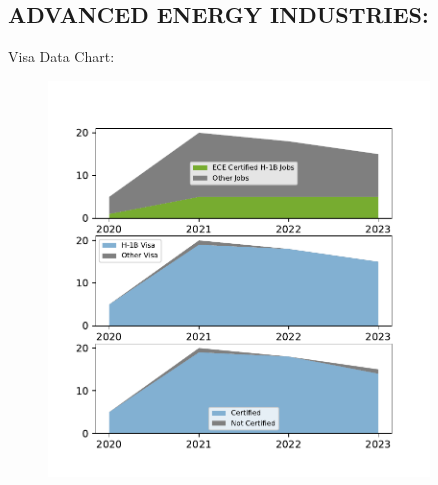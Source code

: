 \documentclass{article}%
\begin{document}
%
\newpage%
\subsection{ADVANCED ENERGY INDUSTRIES:}%
\label{subsec:ADVANCEDENERGYINDUSTRIES}%
Visa Data Chart:%


\begin{figure}[htbp]%
\centering%
\includegraphics[width=0.9\textwidth]{./temp_img/ADVANCEDENERGYINDUSTRIES_detailed.pdf}%
\end{figure}

%
\newpage

%
\end{document}
